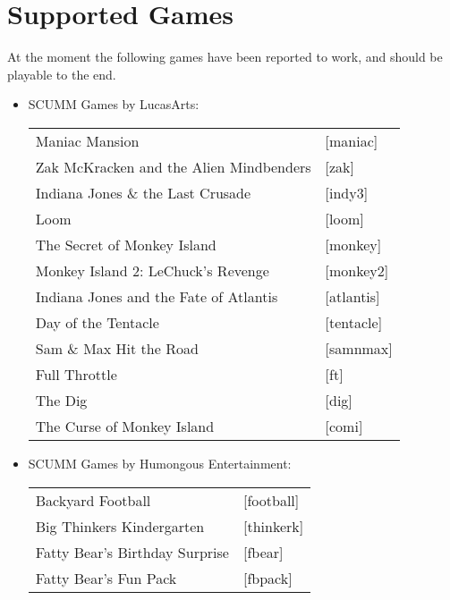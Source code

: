 


\section{Supported Games}

At the moment the following games have been reported to work, and should
be playable to the end.

\begin{itemize}
\item SCUMM Games by LucasArts:\\
  \begin {tabular} [h] {ll}
    Maniac Mansion&                                [maniac]\\
    Zak McKracken and the Alien Mindbenders&       [zak]\\
    Indiana Jones \& the Last Crusade&             [indy3]\\
    Loom&                                          [loom]\\
    The Secret of Monkey Island&                   [monkey]\\
    Monkey Island 2: LeChuck's Revenge&            [monkey2]\\
    Indiana Jones and the Fate of Atlantis&        [atlantis]\\
    Day of the Tentacle&                           [tentacle]\\
    Sam \& Max Hit the Road&                       [samnmax]\\
    Full Throttle&                                 [ft]\\
    The Dig&                                       [dig]\\
    The Curse of Monkey Island&                    [comi]\\
  \end{tabular}
\item SCUMM Games by Humongous Entertainment:\\
  \begin{tabular}[h]{ll}
    Backyard Football&                                             [football]\\
    Big Thinkers Kindergarten&                                     [thinkerk]\\
    Fatty Bear's Birthday Surprise&                                [fbear]\\
    Fatty Bear's Fun Pack&                                         [fbpack]\\

\end{tabular}
\end{itemize}
